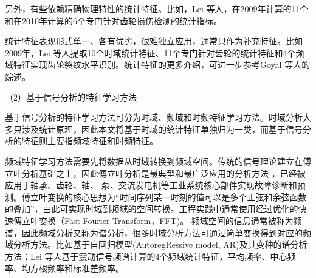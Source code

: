 另外，有些依赖精确物理特性的统计特征。比如，Lei 等人，在2009年\cite{lei2009gear}计算的11个和在2010年\cite{lei2010multidimensional}计算的6个专门针对齿轮损伤检测的统计指标。

统计特征表现形式单一、各有优劣，很难独立应用，通常只作为补充特征。比如2009年，Lei 等人提取10个时域统计特征、11个专门针对齿轮的统计特征和4个频域特征实现齿轮裂纹水平识别\cite{lei2009gear}。统计特征的更多介绍，可进一步参考Goyal 等人的综述\cite{goyal2017condition}。

（2）基于信号分析的特征学习方法


基于信号分析的特征学习方法可分为时域、频域和时频特征学习方法。时域分析大多只涉及统计原理，因此本文将基于时域的统计特征单独归为一类，而基于信号分析的特征则主要指频域特征和时频特征。

频域特征学习方法需要先将数据从时域转换到频域空间。传统的信号理论建立在傅立叶分析基础之上，因此傅立叶分析是最典型和最广泛应用的分析方法
，已经被应用于轴承、齿轮、轴、 泵、交流发电机等工业系统核心部件实现故障诊断和预测\cite{lee2014prognostics}。傅立叶变换的核心思想为“时间序列某一时刻的值可以是多个正弦和余弦函数的叠加”，由此可实现时域到频域的空间转换。工程实践中通常使用经过优化的快速傅立叶变换（Fast Fourier Transform，FFT)\cite{jardine2006review}。
频域空间的信息通常被称为频谱，因此频域分析又称为谱分析，很多时域分析方法可通过简单变换得到对应的频域分析方法。比如基于自回归模型(AutoregRessive model, AR)及其变种的谱分析方法\cite{jardine2006review}；Lei 等人基于震动信号频谱计算的4个频域统计特征，平均频率、中心频率、均方根频率和标准差频率\cite{lei2009gear}。

